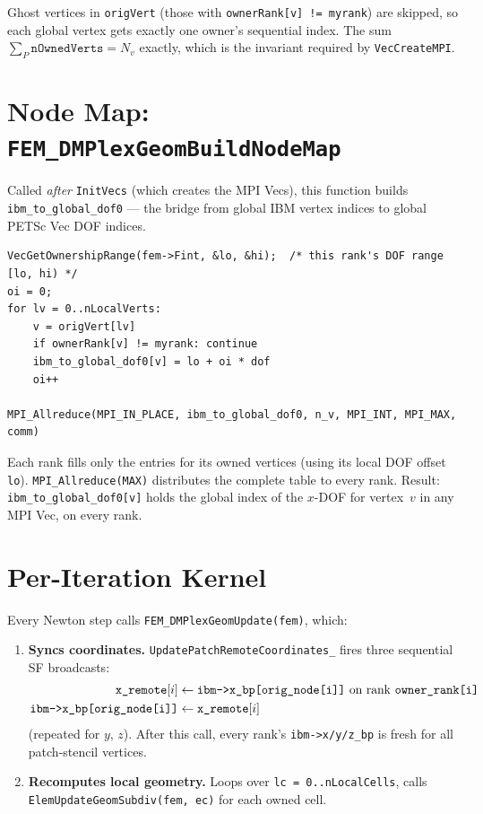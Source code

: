 \documentclass[11pt]{article}
\begin{document}
Ghost vertices in \texttt{origVert} (those with \texttt{ownerRank[v] != myrank})
are skipped, so each global vertex gets exactly one owner's sequential index.
The sum $\sum_P \texttt{nOwnedVerts} = N_v$ exactly, which is the invariant
required by \texttt{VecCreateMPI}.

\section{Node Map: \texttt{FEM\_DMPlexGeomBuildNodeMap}}

Called \emph{after} \texttt{InitVecs} (which creates the MPI Vecs), this function
builds \texttt{ibm\_to\_global\_dof0} --- the bridge from global IBM vertex indices
to global PETSc Vec DOF indices.

\begin{lstlisting}
VecGetOwnershipRange(fem->Fint, &lo, &hi);  /* this rank's DOF range [lo, hi) */
oi = 0;
for lv = 0..nLocalVerts:
    v = origVert[lv]
    if ownerRank[v] != myrank: continue
    ibm_to_global_dof0[v] = lo + oi * dof
    oi++

MPI_Allreduce(MPI_IN_PLACE, ibm_to_global_dof0, n_v, MPI_INT, MPI_MAX, comm)
\end{lstlisting}

Each rank fills only the entries for its owned vertices (using its local DOF offset
\texttt{lo}).  \texttt{MPI\_Allreduce(MAX)} distributes the complete table to every
rank.  Result: \texttt{ibm\_to\_global\_dof0[v]} holds the global index of the
$x$-DOF for vertex~$v$ in any MPI Vec, on every rank.

\section{Per-Iteration Kernel}

Every Newton step calls \texttt{FEM\_DMPlexGeomUpdate(fem)}, which:

\begin{enumerate}
  \item \textbf{Syncs coordinates.}
        \texttt{UpdatePatchRemoteCoordinates\_} fires three sequential SF broadcasts:
        \begin{align*}
          \texttt{x\_remote}[i] &\leftarrow \texttt{ibm->x\_bp[orig\_node[i]]}
          \text{ on rank \texttt{owner\_rank[i]}} \\
          \texttt{ibm->x\_bp[orig\_node[i]]} &\leftarrow \texttt{x\_remote}[i]
        \end{align*}
        (repeated for $y$, $z$).  After this call, every rank's \texttt{ibm->x/y/z\_bp}
        is fresh for all patch-stencil vertices.

  \item \textbf{Recomputes local geometry.}
        Loops over \texttt{lc = 0..nLocalCells}, calls \texttt{ElemUpdateGeomSubdiv(fem, ec)}
        for each owned cell.
\end{enumerate}
\end{document}
